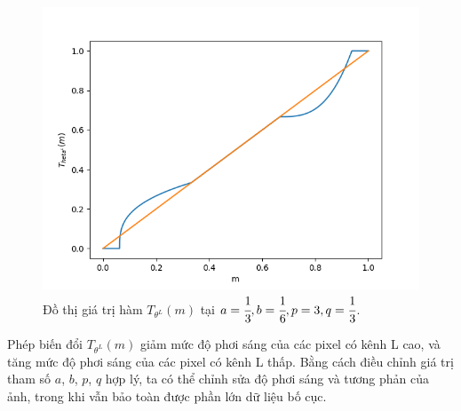 \documentclass[12pt]{extreport}
\begin{document}
\begin{figure}[H]
    \centering
    \includegraphics[width=.7\linewidth]{figure45.png}
    \caption{Đồ thị giá trị hàm $ T_{\theta^L}(m) $ tại $ a = \cfrac{1}{3}, b = \cfrac{1}{6}, p = 3, q = \cfrac{1}{3} $.}
\end{figure}

Phép biến đổi $ T_{\theta^L}(m) $ giảm mức độ phơi sáng của các pixel có kênh L cao, và tăng mức độ phơi sáng của các pixel có kênh L thấp. Bằng cách điều chỉnh giá trị tham số $ a $, $ b $, $ p $, $ q $ hợp lý, ta có thể chỉnh sửa độ phơi sáng và tương phản của ảnh, trong khi vẫn bảo toàn được phần lớn dữ liệu bố cục.
\end{document}
